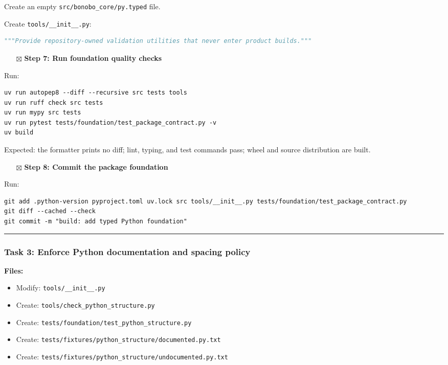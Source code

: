 \documentclass[
  letterpaper,
]{article}
\providecommand{\tightlist}{%
  \setlength{\itemsep}{0pt}\setlength{\parskip}{0pt}}
\begin{document}
Create an empty \nolinkurl{src/bonobo_core/py.typed} file.

Create \nolinkurl{tools/__init__.py}:

\begin{lstlisting}[language=Python]
"""Provide repository-owned validation utilities that never enter product builds."""
\end{lstlisting}

\begin{itemize}
\tightlist
\item[$\boxtimes$]
  \textbf{Step 7: Run foundation quality checks}
\end{itemize}

Run:

\begin{lstlisting}
uv run autopep8 --diff --recursive src tests tools
uv run ruff check src tests
uv run mypy src tests
uv run pytest tests/foundation/test_package_contract.py -v
uv build
\end{lstlisting}

Expected: the formatter prints no diff; lint, typing, and test commands pass; wheel and source distribution are built.

\begin{itemize}
\tightlist
\item[$\boxtimes$]
  \textbf{Step 8: Commit the package foundation}
\end{itemize}

Run:

\begin{lstlisting}
git add .python-version pyproject.toml uv.lock src tools/__init__.py tests/foundation/test_package_contract.py
git diff --cached --check
git commit -m "build: add typed Python foundation"
\end{lstlisting}

\begin{center}\rule{0.5\linewidth}{0.5pt}\end{center}

\subsubsection{Task 3: Enforce Python documentation and spacing
policy}\label{task-3-enforce-python-documentation-and-spacing-policy}

\textbf{Files:}

\begin{itemize}
\tightlist
\item
  Modify: \nolinkurl{tools/__init__.py}
\item
  Create: \nolinkurl{tools/check_python_structure.py}
\item
  Create: \nolinkurl{tests/foundation/test_python_structure.py}
\item
  Create: \nolinkurl{tests/fixtures/python_structure/documented.py.txt}
\item
  Create: \nolinkurl{tests/fixtures/python_structure/undocumented.py.txt}
\end{itemize}
\end{document}
